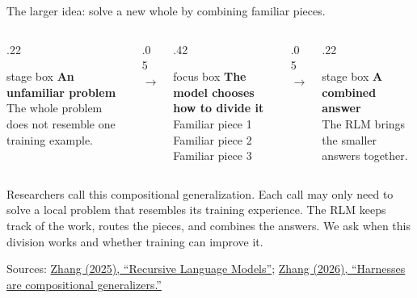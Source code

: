 \documentclass[aspectratio=169,11pt]{beamer}
\newcommand{\rlmstagebox}[1]{%
  \begin{beamercolorbox}[wd=\linewidth,sep=.55em,center,rounded=true]{stage box}
    #1
  \end{beamercolorbox}%
}
\newcommand{\rlmfocusbox}[1]{%
  \begin{beamercolorbox}[wd=\linewidth,sep=.55em,center,rounded=true]{focus box}
    #1
  \end{beamercolorbox}%
}
\begin{document}
\begin{frame}{The larger idea: solve a new whole by combining familiar pieces.}
  \begin{columns}[c,onlytextwidth]
    \begin{column}{.22\textwidth}
      \rlmstagebox{\textbf{An unfamiliar problem}\\[.25em]
        \small The whole problem does not resemble one training example.}
    \end{column}
    \begin{column}{.05\textwidth}
      \centering\Large\color{RlmTeal}$\rightarrow$
    \end{column}
    \begin{column}{.42\textwidth}
      \rlmfocusbox{\textbf{The model chooses how to divide it}\\[.35em]
        \small Familiar piece 1\\[.15em]
        Familiar piece 2\\[.15em]
        Familiar piece 3}
    \end{column}
    \begin{column}{.05\textwidth}
      \centering\Large\color{RlmTeal}$\rightarrow$
    \end{column}
    \begin{column}{.22\textwidth}
      \rlmstagebox{\textbf{A combined answer}\\[.25em]
        \small The RLM brings the smaller answers together.}
    \end{column}
  \end{columns}

  \vspace{0.35cm}
  \begin{block}{Researchers call this compositional generalization.}
    Each call may only need to solve a local problem that resembles its training experience. The
    RLM keeps track of the work, routes the pieces, and combines the answers. We ask when this
    division works and whether training can improve it.
  \end{block}

  \vfill
  {\tiny\color{RlmMuted}
    Sources: \href{https://alexzhang13.github.io/blog/2025/rlm/}{Zhang (2025), ``Recursive
    Language Models''}; \href{https://alexzhang13.github.io/blog/2026/harness/}{Zhang (2026),
    ``Harnesses are compositional generalizers.''}}
\end{frame}
\end{document}
